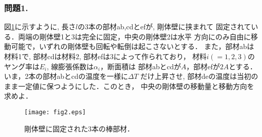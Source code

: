 \documentclass[10pt,a4j]{jarticle}
\begin{document}
\subsubsection*{問題1.}
図\ref{fig:fig2}に示すように, 長さ$l$の3本の部材ab,cdとefが, 剛体壁に挟まれて
固定されている．両端の剛体壁1と3は完全に固定，中央の剛体壁2は水平
方向にのみ自由に移動可能で，いずれの剛体壁も回転や転倒は起こさないとする．
また，部材abは材料1で, 部材cdは材料2, 部材efは3によって作られており，
材料$i(=1,2,3)$のヤング率は$E_i$, 線膨張係数は$\alpha_i$，断面積は
部材abとcdが$A$，部材efが$2A$とする．いま，2本の部材abとcdの温度を一様に$\Delta T$
だけ上昇させ, 部材deの温度は当初のまま一定値に保つようにした．このとき，
中央の剛体壁の移動量と移動方向を求めよ．
\begin{figure}[h]
	\begin{center}
	\texttt{[image: fig2.eps]} 
	\end{center}
	\caption{剛体壁に固定された3本の棒部材．} 
	\label{fig:fig2}
\end{figure}
\end{document}
